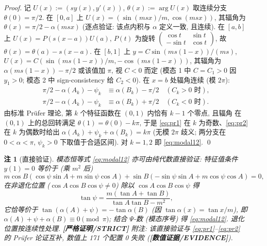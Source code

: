\documentclass[UTF8]{ctexart}
\newtheorem{remark}[theorem]{注}
\newcommand{\STRICT}{\textbf{[严格证明/STRICT]}}
\newcommand{\EVID}{\textbf{[数值证据/EVIDENCE]}}
\begin{document}
\begin{proof}
	记 $U(x):=(sy(x),y'(x))$, $\theta(x):=\arg U(x)$ 取连续分支 $\theta(0)=\pi/2$.
	在 $[0,a]$ 上 $U(x)=(\sin(msx)/m,\cos(msx))$, 其辐角为
	$\theta(x)=\pi/2-\alpha(msx)$ (逐点验证: 该点内积与 $\alpha$ 定义一致, 且连续).
	在 $[a,b]$ 上 $U(x)=P(s(x-a))U(a)$, $P(t)$ 为旋转
	$\begin{pmatrix}\cos t&\sin t\\-\sin t&\cos t\end{pmatrix}$, 故
	$\theta(x)=\theta(a)-s(x-a)$.
	在 $[b,1]$ 上 $y=C\sin(ms(1-x))/(ms)$, $U(x)=C(\sin(ms(1-x))/m,-\cos(ms(1-x)))$,
	其辐角为 $\alpha(ms(1-x))-\pi/2$ 或该值加 $\pi$, 视 $C<0$ 而定 (模态 1 中
	$C=C_1>0$ 因 $y_1>0$; 模态 2 中 sign-consistency 给 $C_2<0$).
	在 $x=b$ 处辐角连续 (模 $2\pi$):
	\begin{align}
		\pi/2-\alpha(A_k)-\psi_k &\equiv \alpha(B_k)-\pi/2
		\quad(C_k>0\text{ 时}),\label{eq:pr1}\\
		\pi/2-\alpha(A_k)-\psi_k &\equiv \alpha(B_k)+\pi/2
		\quad(C_k<0\text{ 时}).\label{eq:pr2}
	\end{align}
	由标准 Pr\"ufer 理论, 第 $k$ 个特征函数在 $(0,1)$ 内恰有 $k-1$ 个零点, 且辐角
	在 $(0,1)$ 上的总回转满足 $\theta(1)=\theta(0)-k\pi$, 于是 \eqref{eq:pr1}
	在 $k$ 为奇数、\eqref{eq:pr2} 在 $k$ 为偶数时给出 $\alpha(A_k)+\psi_k+\alpha(B_k)=k\pi$
	(无模 $2\pi$ 歧义; 两分支在 $0<\alpha< \pi$, $\psi_k>0$ 下取值于合适区间).
	对 $k=1,2$ 即 \eqref{eq:modal12}. \qed
\end{proof}

\begin{remark}[直接验证]
	模态恒等式 \eqref{eq:modal12} 亦可由纯代数直接验证: 特征值条件 $y(1)=0$ 等价于
	(乘 $m^2$ 后)
	\begin{equation}
		m\cos B(\cos\psi\sin A+m\sin\psi\cos A)+\sin B(-\sin\psi\sin A+m\cos\psi\cos A)=0,
	\end{equation}
	在非退化位置 ($\cos A\cos B\cos\psi\ne0$) 除以 $\cos A\cos B\cos\psi$ 得
	\begin{equation}
		\tan\psi=\frac{m(\tan A+\tan B)}{\tan A\tan B-m^2},
		\label{eq:tanpsi}
	\end{equation}
	它恰等价于 $\tan(\alpha(A)+\psi)=-\tan\alpha(B)$ (因 $\tan\alpha(x)=\tan x/m$),
	即 $\alpha(A)+\psi+\alpha(B)\equiv0\pmod\pi$; 结合 $\Psi$-数 (模态序号) 得
	\eqref{eq:modal12}. 退化位置按连续性处理. \STRICT{} 附注: 该直接验证与
	\eqref{eq:pr1}--\eqref{eq:pr2} 的 Pr\"ufer 论证互补, 数值上 171 个配置
	0 失败 (\EVID).
\end{remark}
\end{document}
